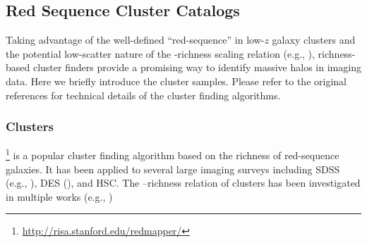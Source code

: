 \documentclass[fleqn,usenatbib,useAMS,english]{mnras}
\begin{document}
\subsection{Red Sequence Cluster Catalogs}
    \label{sec:cluster_sample}

    Taking advantage of the well-defined ``red-sequence'' in low-$z$ galaxy clusters and
    the potential low-scatter nature of the \mvir{}-richness scaling relation
    (e.g., \citealt{Rozo2009, Rykoff2012}),
    richness-based cluster finders provide a promising way to identify massive halos in
    imaging data.
    Here we briefly introduce the cluster samples. Please refer to the original references
    for technical details of the cluster finding algorithms.

\subsubsection{\redm{} Clusters}
    \label{sec:cluster_redmapper}

    \redm{} \citet{Rykoff2014, Rozo2014, Rozo2015a, Rozo2015b}
    \footnote{\url{http://risa.stanford.edu/redmapper/}} is a popular cluster finding algorithm
    based on the richness of red-sequence galaxies.
    It has been applied to several large imaging surveys including SDSS (e.g.,
    \citealt{Rykoff2014}), DES (\citealt{Rykoff2016, McClintock2019}), and HSC.
    The \mvir{}--richness relation of \redm{} clusters has been investigated in multiple
    works (e.g., \citealt{Saro2015, Farahi2016, Simet2017, Melchior2017, Baxter2018, Murata2018,
    McClintock2019})
\end{document}
